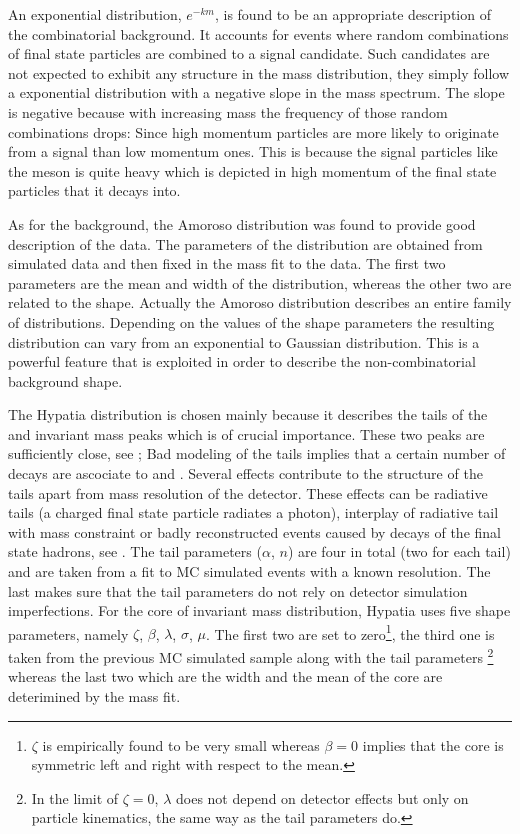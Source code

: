 \noindent An exponential distribution, $e^{-km}$, is found to be an appropriate description of the combinatorial background. It  accounts
for events where random combinations of final state particles are combined to a signal candidate. Such candidates are not expected to
exhibit any structure in the mass distribution, they simply follow a exponential distribution with a negative slope in the mass spectrum.
The slope is negative because with increasing mass the frequency of those random combinations drops: Since high momentum particles are more
likely to originate from a signal than low momentum ones. This is because the signal particles like the \Bs meson is quite heavy which is
depicted in high momentum of the final state particles that it decays into.

As for the \LbJpsippi background, the Amoroso distribution was found to provide good description of the data.
The parameters of the distribution are obtained from simulated data and then fixed in the mass fit to the data. The first two parameters
are the mean and width of the distribution, whereas the other two are related to the shape. Actually the Amoroso distribution describes
an entire family of distributions. Depending on the values of the shape parameters the resulting distribution can vary from an exponential
to Gaussian distribution. This is a powerful feature that is exploited in order to describe the \LbJpsippi non-combinatorial background shape.

The Hypatia distribution is chosen mainly because it describes the tails of the \Bs and \Bd invariant mass peaks which is
of crucial importance. These two peaks are sufficiently close, see ; Bad modeling of the tails implies
that a certain number of \Bd decays are ascociate to \Bs and \viceversa. Several effects contribute to the structure of the tails apart
from mass resolution of the detector. These effects can be radiative tails (a charged final state particle radiates a photon), interplay of
radiative tail with \jpsi mass constraint or badly reconstructed events caused by decays of the final state hadrons, see \cite{Santos:2013gra}.
The tail parameters ($\alpha$, $n$) are four in total (two for each tail) and are taken from a fit to MC simulated events with a known resolution.
The last makes sure that the tail parameters do not rely on detector simulation imperfections.
For the core of invariant mass distribution, Hypatia uses five shape parameters, namely $\zeta$, $\beta$, $\lambda$, $\sigma$, $\mu$.
The first two are set to zero\footnote{$\zeta$ is empirically found to be very small whereas
$\beta = 0$ implies that the core is symmetric left and right with respect to the mean.}, the third one is taken from the previous
MC simulated sample along with the tail parameters \footnote{In the limit of $\zeta = 0$, $\lambda$ does not depend on detector
effects but only on particle kinematics, the same way as the tail parameters do.} whereas the last two which are the width and
the mean of the core are deterimined by the mass fit.

